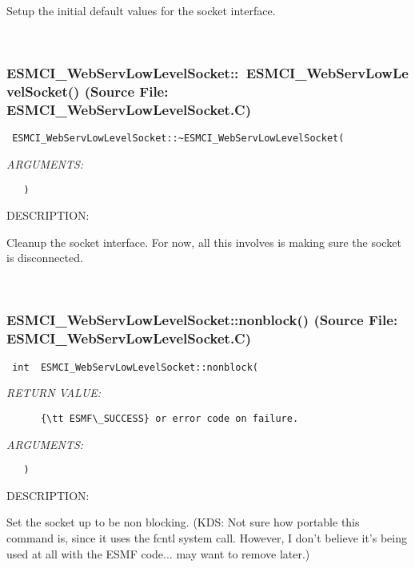      Setup the initial default values for the socket interface.
   
 
\mbox{}\hrulefill\
 
\subsubsection{ESMCI\_WebServLowLevelSocket::~ESMCI\_WebServLowLevelSocket() (Source File: ESMCI\_WebServLowLevelSocket.C)}


  
\begin{verbatim} ESMCI_WebServLowLevelSocket::~ESMCI_WebServLowLevelSocket(\end{verbatim}{\em ARGUMENTS:}
\begin{verbatim}   )\end{verbatim}
{\sf DESCRIPTION:\\ }


      Cleanup the socket interface.  For now, all this involves is making
      sure the socket is disconnected.
   
 
\mbox{}\hrulefill\
 
\subsubsection{ESMCI\_WebServLowLevelSocket::nonblock() (Source File: ESMCI\_WebServLowLevelSocket.C)}


  
\begin{verbatim} int  ESMCI_WebServLowLevelSocket::nonblock(\end{verbatim}{\em RETURN VALUE:}
\begin{verbatim}      {\tt ESMF\_SUCCESS} or error code on failure.\end{verbatim}{\em ARGUMENTS:}
\begin{verbatim}   )\end{verbatim}
{\sf DESCRIPTION:\\ }


      Set the socket up to be non blocking.
      (KDS: Not sure how portable this command is, since it uses the fcntl
            system call.  However, I don't believe it's being used at all
            with the ESMF code... may want to remove later.)
   

